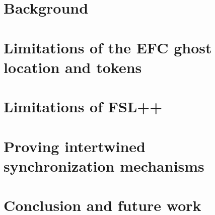 \documentclass[titlepage,11pt,a4paper]{report}
\theoremstyle{plain}
\begin{document}
\chapter{Background}
\label{ch:background}



\chapter{Limitations of the EFC ghost location and tokens}



\chapter{Limitations of FSL++}


\chapter{Proving intertwined synchronization mechanisms}




\chapter{Conclusion and future work}

%



\appendix



\end{document}
